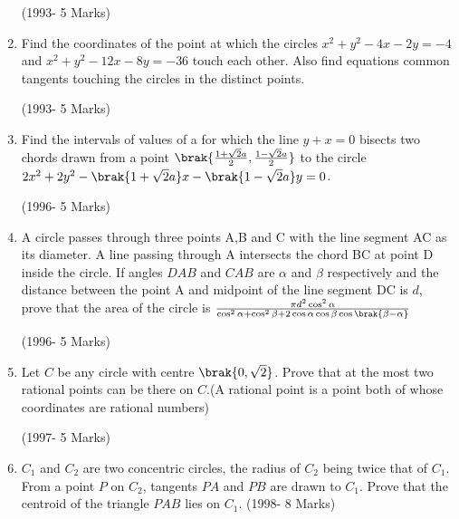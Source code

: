 \begin{enumerate}
\hfill(1993- 5 Marks)\\





\item Find the coordinates of the point at which the circles $x^2+y^2-4x-2y=-4$ and $x^2+y^2-12x-8y=-36$ touch each other. Also find equations common tangents touching the circles in the distinct points.                        

\hfill(1993- 5 Marks)\\


\item Find the intervals of values of a for which the line $y+x=0$ bisects two chords drawn from a point $\brak {\frac{1+\sqrt{2}a}{2},\frac{1-\sqrt{2}a}{2}}$ to the circle $2x^2+2y^2-\brak{1+\sqrt{2}a}x-\brak{1-\sqrt{2}a}y=0$.  

\hfill(1996- 5 Marks)\\





\item A circle passes through three points A,B and C with the line segment AC as its diameter. A line passing through A intersects the chord BC at point D inside the circle. If angles $DAB$ and $CAB$ are $\alpha$ and $\beta$ respectively and the distance between the point A and midpoint of the line segment DC is $d$, prove that the area of the circle is $\frac{\pi d^2 \cos^2{\alpha} }{\cos^2{\alpha}+\cos^2{\beta}+ 2\cos{\alpha} \cos{\beta} \cos{\brak{\beta-\alpha}}}$                

\hfill(1996- 5 Marks)\\





\item Let $C$ be any circle with centre $\brak{0,\sqrt{2}}$. Prove that at the most two rational points can be there on $C$.(A rational point is a point both of whose coordinates are rational numbers)
	           
\hfill(1997- 5 Marks)\\




\item $C_{1}$ and $C_{2}$ are two concentric circles, the radius of $C_{2}$ being twice that of $C_{1}$. From a point $P$ on $C_{2}$, tangents $PA$ and $PB$ are drawn to $C_{1}$. Prove that the centroid of the triangle $PAB$ lies on $C_{1}$.
	           \hfill(1998- 8 Marks)\\





\end{enumerate}
